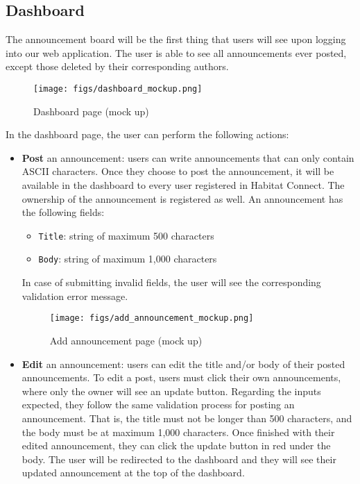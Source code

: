 \documentclass[conference]{IEEEtran}
\begin{document}
\subsection{Dashboard}
The announcement board will be the first thing that users will see upon logging into our web application. The user is able to see all announcements ever posted, except those deleted by their corresponding authors.
\begin{figure}[H]
\centering
\texttt{[image: figs/dashboard\_mockup.png]}
\caption{Dashboard page (mock up)}
\label{fig:Dashboard mockup}
\end{figure}
In the dashboard page, the user can perform the following actions:
\begin{itemize}
    \item \textbf{Post} an announcement: users can write announcements that can only contain ASCII characters. Once they choose to post the announcement, it will be available in the dashboard to every user registered in Habitat Connect. The ownership of the announcement is registered as well. An announcement has the following fields:
    \begin{itemize}
        \item \texttt{Title}: string of maximum 500 characters
        \item \texttt{Body}: string of maximum 1,000 characters
    \end{itemize}
    In case of submitting invalid fields, the user will see the corresponding validation error message.
    \begin{figure}[H]
    \centering
    \texttt{[image: figs/add\_announcement\_mockup.png]}
    \caption{Add announcement page (mock up)}
    \label{fig:Add announcement mockup}
    \end{figure}
    \item \textbf{Edit} an announcement: users can edit the title and/or body of their posted announcements. To edit a post, users must click their own announcements, where only the owner will see an update button. Regarding the inputs expected, they follow the same validation process for posting an announcement. That is, the title must not be longer than 500 characters, and the body must be at maximum 1,000 characters. Once finished with their edited announcement, they can click the update button in red under the body. The user will be redirected to the dashboard and they will see their updated announcement at the top of the dashboard.
    \begin{figure}[H]
    \centering

\end{figure}
\end{itemize}
\end{document}
